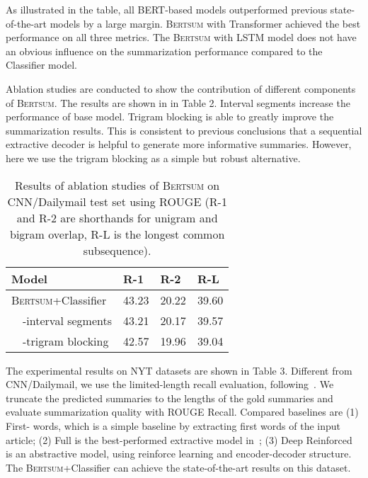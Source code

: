 \documentclass[11pt,a4paper]{article}
\begin{document}
    
      As illustrated in the table, all   BERT-based models outperformed previous state-of-the-art models by a large margin. \textsc{Bertsum} with Transformer achieved the best performance on all three metrics. The \textsc{Bertsum} with LSTM model does not have an obvious influence on the summarization performance compared to the  Classifier model. 
    
    Ablation studies  are conducted to show the contribution of different components of \textsc{Bertsum}. The results are shown in in Table 2. Interval segments  increase the performance of base model. Trigram blocking is able to greatly improve the summarization results. This is consistent to previous conclusions that a sequential extractive decoder is helpful to generate more informative summaries. However, here we  use the trigram blocking as a simple but robust alternative.

        \begin{table}[!htbp]
    \begin{tabular}{l|lll}
        Model              & R-1    & R-2    & R-L    \\ \hline
        \textsc{Bertsum}+Classifier  & 43.23  & 20.22 & 39.60\\
        ~~-interval segments & 43.21 & 20.17 &  39.57 \\
        ~~-trigram blocking  & 42.57  & 19.96 & 39.04
    \end{tabular}
    \caption{Results of ablation studies of \textsc{Bertsum} on CNN/Dailymail test set using  ROUGE  (R-1 and R-2 are
        shorthands for unigram and bigram overlap, R-L  is the
        longest common subsequence).}
    
\end{table}

    The experimental results on NYT datasets are shown in Table 3. Different from CNN/Dailymail, we use the limited-length recall evaluation, following~\citet{durrett2016learning}. We truncate the predicted summaries to the lengths of the gold summaries and evaluate summarization quality with ROUGE Recall. 
    Compared baselines are (1) First- words, which is a simple baseline by extracting first  words of the input article; (2) Full is the best-performed extractive model in~\citet{durrett2016learning}; (3) Deep Reinforced~\cite{paulus2017deep} is an abstractive model, using reinforce learning and encoder-decoder structure. The \textsc{Bertsum}+Classifier  can achieve the state-of-the-art results on this dataset.
    
\end{document}
